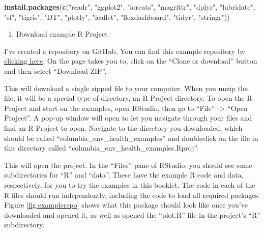 \documentclass[]{tufte-book}
\newenvironment{Shaded}{}{}
\newcommand{\KeywordTok}[1]{\textcolor[rgb]{0.00,0.44,0.13}{\textbf{#1}}}
\newcommand{\NormalTok}[1]{#1}
\newcommand{\StringTok}[1]{\textcolor[rgb]{0.25,0.44,0.63}{#1}}
\providecommand{\tightlist}{%
  \setlength{\itemsep}{0pt}\setlength{\parskip}{0pt}}
\begin{document}
\begin{Shaded}
\begin{Highlighting}[]
\KeywordTok{install.packages}\NormalTok{(}\KeywordTok{c}\NormalTok{(}\StringTok{"readr"}\NormalTok{, }\StringTok{"ggplot2"}\NormalTok{, }\StringTok{"forcats"}\NormalTok{, }
    \StringTok{"magrittr"}\NormalTok{, }\StringTok{"dplyr"}\NormalTok{, }\StringTok{"lubridate"}\NormalTok{, }\StringTok{"sf"}\NormalTok{, }\StringTok{"tigris"}\NormalTok{, }
    \StringTok{"DT"}\NormalTok{, }\StringTok{"plotly"}\NormalTok{, }\StringTok{"leaflet"}\NormalTok{, }\StringTok{"flexdashboard"}\NormalTok{, }
    \StringTok{"tidyr"}\NormalTok{, }\StringTok{"stringr"}\NormalTok{))}
\end{Highlighting}
\end{Shaded}

\begin{enumerate}
\def\labelenumi{\arabic{enumi}.}
\setcounter{enumi}{3}
\tightlist
\item
  Download example R Project
\end{enumerate}

I've created a repository on GitHub. You can find this example
repository by \href{https://github.com/geanders/columbia_env_health_examples}{clicking here}. On the
page takes you to, click on the ``Clone or download'' button and then select ``Download ZIP''.

This will download a single zipped file to your computer. When you unzip the file, it will be a
special type of directory, an R Project directory. To open the R Project and start on the
examples, open RStudio, then go to ``File'' -\textgreater{} ``Open Project''. A pop-up window will open to let you
navigate through your files and find an R Project to open. Navigate to the directory you
downloaded, which should be called ``columbia\_env\_health\_examples'' and doubleclick on the file
in this directory called ``columbia\_env\_health\_examples.Rproj''.

This will open the project. In the ``Files'' pane of RStudio, you should see some subdirectories for
``R'' and ``data''. These have the example R code and data, respectively, for you to try the examples
in this booklet. The code in each of the R files should run independently, including the code to
load all required packages. Figure \ref{fig:examplerepo} shows what this package should
look like once you've downloaded and opened it, as well as opened the ``plot.R'' file in the
project's ``R'' subdirectory.
\end{document}
